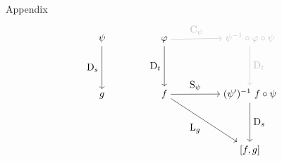 \documentclass[10pt,T]{beamer}
\newcommand{\transparent}[1]{\textcolor{lightgray}{#1}}
\begin{document}
\begin{frame}[fragile]{Appendix}
\[
\begin{tikzpicture}[descr/.style={fill=white}]
\matrix(m)[matrix of math nodes, row sep=4em, column sep=5em]
{\psi & \varphi & \transparent{\psi^{-1}\circ\varphi\circ\psi} \\
g & f & (\psi')^{-1}~f\circ\psi\\
& & \lbrack f,g\rbrack \\};
\path[->] (m-1-1) edge node[left] {D$_s$} (m-2-1);
\transparent{\path[->] (m-1-2) edge node[above] {C$_{\psi}$} (m-1-3);}
\path[->] (m-1-2) edge node[left] {D$_t$} (m-2-2);
\transparent{\path[->] (m-1-3) edge node[right] {D$_t$} (m-2-3);}
\path[->] (m-2-2) edge node[above] {S$_{\psi}$} (m-2-3);
\path[->] (m-2-2) edge node[below left] {L$_g$} (m-3-3);
\path[->] (m-2-3) edge node[right] {D$_s$} (m-3-3);
\end{tikzpicture}
\]
\end{frame}
\end{document}
